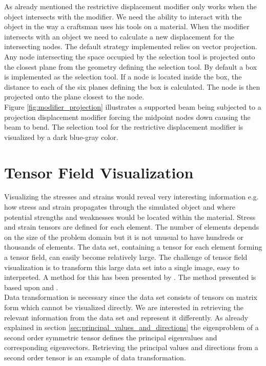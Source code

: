 As already mentioned the
restrictive displacement modifier only works when 
the object intersects with the modifier. 
We need the ability to
interact with the object in the way a craftsman uses his tools on
a material. When the modifier intersects with an object we need to 
calculate a new displacement for the intersecting nodes.
The default strategy implemented relies on vector projection. Any node
intersecting the space occupied by the selection tool is projected
onto the closest plane from the geometry defining the selection tool.
By default a box is implemented as the selection tool. If a node
is located inside the box, the distance to each of the six planes
defining the box is calculated. The node is then projected onto the
plane closest to the node. \\

Figure \vref{fig:modifier_projection} illustrates a supported beam
being subjected to a projection displacement modifier forcing the
midpoint nodes down causing the beam to bend. The selection tool for
the restrictive displacement modifier is visualized by a dark
blue-gray color.

\section{Tensor Field Visualization}
Visualizing the stresses and strains would reveal very interesting
information e.g. how stress and strain propagates through the
simulated object and where potential strengths and weaknesses would be
located within the material. 
%
Stress and strain tensors are defined for each element. The number of
elements depends on the size 
of the problem domain but it is not unusual to have hundreds or
thousands of elements. The data set, containing a tensor for each
element forming a tensor field, can easily become relatively
large. The challenge of tensor 
field visualization is to transform this large data set into a single
image, easy to interpreted. A method for this has been presented by
. The method presented is based 
upon  and . \\

Data transformation is necessary since the data set consists of tensors on
matrix form which cannot be visualized directly. We are interested in
retrieving the relevant information from the data set and represent it
differently. As already explained in section
\vref{sec:principal_values_and_directions} the eigenproblem of a
second order symmetric tensor defines the principal eigenvalues and
corresponding eigenvectors. Retrieving the principal values and
directions from a second order tensor is an example of data
transformation. \\ 

